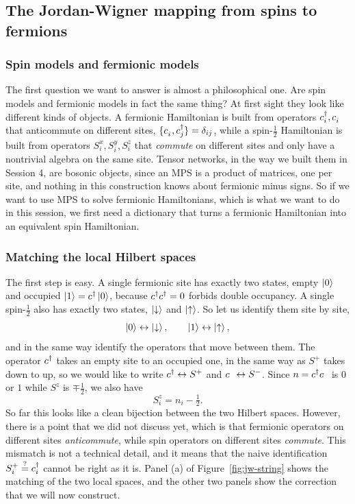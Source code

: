 \documentclass[lecture_notes.tex]{subfiles}
\begin{document}
\subsection{The Jordan-Wigner mapping from spins to fermions}
\label{sec:jw}

\subsubsection{Spin models and fermionic models}
The first question we want to answer is almost a philosophical one. Are spin models and fermionic
models in fact the same thing? At first sight they look like different kinds of objects. A
fermionic Hamiltonian is built from operators $\cre{i},\ann{i}$ that anticommute on different
sites, $\{\ann{i},\cre{j}\}=\delta_{ij}$, while a spin-$\tfrac12$ Hamiltonian is built from
operators $S_i^x,S_i^y,S_i^z$ that \emph{commute} on different sites and only have a nontrivial
algebra on the same site. Tensor networks, in the way we built them in Session 4, are bosonic
objects, since an MPS is a product of matrices, one per site, and nothing in this construction
knows about fermionic minus signs. So if we want to use MPS to solve fermionic Hamiltonians, which
is what we want to do in this session, we first need a dictionary that turns a fermionic
Hamiltonian into an equivalent spin Hamiltonian.

\subsubsection{Matching the local Hilbert spaces}
The first step is easy. A single fermionic site has exactly two states, empty $\ket{0}$ and
occupied $\ket{1}=c^{\dagger}_{}\ket{0}$, because $c^{\dagger}_{}c^{\dagger}_{}=0$ forbids double occupancy. A single
spin-$\tfrac12$ also has exactly two states, $\ket{\downarrow}$ and $\ket{\uparrow}$. So let us identify
them site by site,
\begin{equation}
  \ket{0} \leftrightarrow \ket{\downarrow}, \qquad \ket{1} \leftrightarrow \ket{\uparrow},
\end{equation}
and in the same way identify the operators that move between them. The operator $c^{\dagger}_{}$ takes an
empty site to an occupied one, in the same way as $S^+$ takes down to up, so we would like to write
$c^{\dagger}_{}\leftrightarrow S^+$ and $\ann{}\leftrightarrow S^-$. Since $n=\cre{}\ann{}$ is $0$ or $1$
while $S^z$ is $\mp\tfrac12$, we also have
\begin{equation}
  S_i^z = n_i - \tfrac12.
\end{equation}
So far this looks like a clean bijection between the two Hilbert spaces. However, there is a point
that we did not discuss yet, which is that fermionic operators on different sites
\emph{anticommute}, while spin operators on different sites \emph{commute}. This mismatch is not a
technical detail, and it means that the naive identification $S_i^+\stackrel{?}{=}c^{\dagger}_{i}$ cannot
be right as it is. Panel (a) of Figure~\ref{fig:jw-string} shows the matching of the two local
spaces, and the other two panels show the correction that we will now construct.
\end{document}
